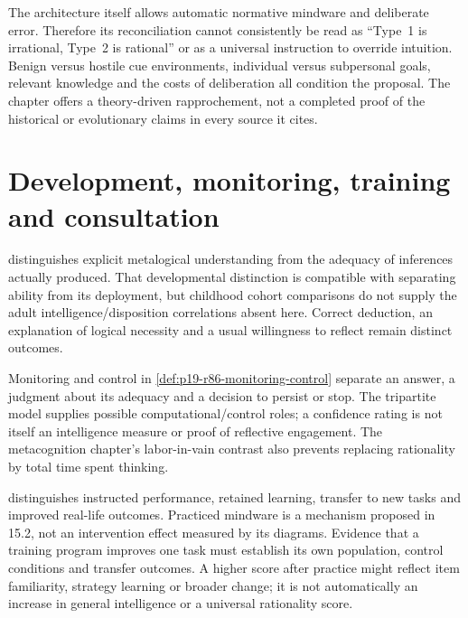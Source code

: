 The architecture itself allows automatic normative mindware and deliberate
error. Therefore its reconciliation cannot consistently be read as
``Type~1 is irrational, Type~2 is rational'' or as a universal instruction
to override intuition. Benign versus hostile cue environments, individual
versus subpersonal goals, relevant knowledge and the costs of deliberation
all condition the proposal. The chapter offers a theory-driven rapprochement,
not a completed proof of the historical or evolutionary claims in every
source it cites.

\section{Development, monitoring, training and consultation}
\label{sec:p19-rat152-use}

 distinguishes explicit metalogical
understanding from the adequacy of inferences actually produced. That
developmental distinction is compatible with separating ability from its
deployment, but childhood cohort comparisons do not supply the adult
intelligence/disposition correlations absent here. Correct deduction,
an explanation of logical necessity and a usual willingness to reflect
remain distinct outcomes.

Monitoring and control in \cref{def:p19-r86-monitoring-control} separate
an answer, a judgment about its adequacy and a decision to persist or stop.
The tripartite model supplies possible computational/control roles; a
confidence rating is not itself an intelligence measure or proof of
reflective engagement. The metacognition chapter's labor-in-vain contrast
also prevents replacing rationality by total time spent thinking.

 distinguishes instructed performance,
retained learning, transfer to new tasks and improved real-life outcomes.
Practiced mindware is a mechanism proposed in 15.2, not an intervention
effect measured by its diagrams. Evidence that a training program improves
one task must establish its own population, control conditions and transfer
outcomes. A higher score after practice might reflect item familiarity,
strategy learning or broader change; it is not automatically an increase
in general intelligence or a universal rationality score.

